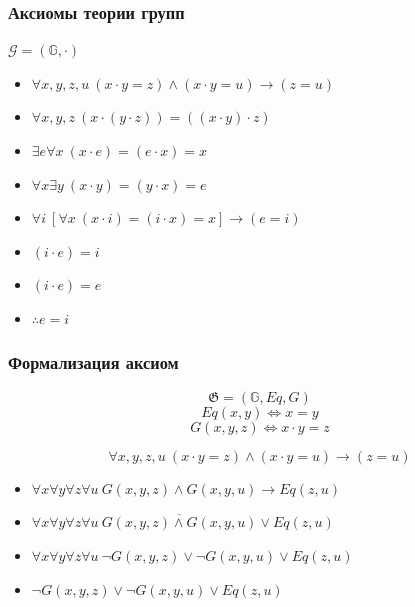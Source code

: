 \documentclass[24pt,pdf,hyperref={unicode},aspectratio=169]{beamer}
\begin{document}
\begin{frame}\frametitle{Аксиомы теории групп}
$\mathcal{G}=(\mathbb{G},\cdot)$

\begin{itemize}
\item<+-> $\forall x,y,z,u\ (x\cdot y=z) \wedge (x\cdot y=u)\rightarrow (z=u)$

\item<+-> $\forall x,y,z\ (x\cdot (y\cdot z))=((x\cdot y)\cdot z) $

\item<+-> $\exists e\forall x\ (x\cdot e)=(e\cdot x)=x$

\item<+-> $\forall x\exists y\ (x\cdot y)=(y \cdot x)=e$
\end{itemize}

\begin{itemize}
\item<+-> $\forall i\ \left[\forall x\ (x\cdot i)=(i\cdot x)=x\right]\rightarrow (e=i)$
\end{itemize}

\begin{itemize}
\item<+-> $(i\cdot e)=i$
\item<+-> $(i\cdot e)=e$
\item<+-> $\therefore e=i$
\end{itemize}
\end{frame}


\begin{frame}\frametitle{Формализация аксиом}
$$
\mathfrak{G}=(\mathbb{G},Eq,G)
$$
$$Eq(x,y)\Leftrightarrow x=y$$
$$G(x,y,z)\Leftrightarrow x\cdot y=z$$

$$
\forall x,y,z,u\ (x\cdot y=z) \wedge (x\cdot y=u)\rightarrow (z=u)
$$
\begin{itemize}
\item<+-> $\forall x \forall y \forall z \forall u\ G(x,y,z) \wedge G(x,y,u)\rightarrow Eq(z,u)$
\item<+-> $\forall x \forall y \forall z \forall u\ \overline{G(x,y,z) \wedge G(x,y,u)}\vee Eq(z,u)$
\item<+-> $\forall x \forall y \forall z \forall u\ \neg G(x,y,z) \vee \neg G(x,y,u)\vee Eq(z,u)$
\item<+-> $\neg G(x,y,z) \vee \neg G(x,y,u)\vee Eq(z,u)$
\end{itemize}
\end{frame}
\end{document}
